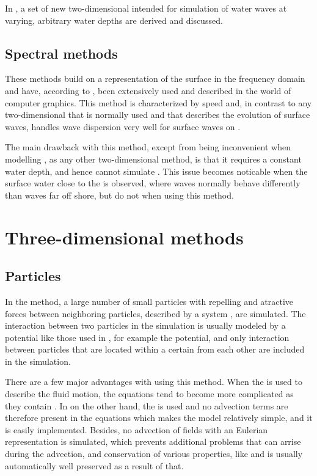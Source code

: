 In , a set of new two-dimensional \PDEs intended for simulation of water waves at varying, arbitrary water depths are derived and discussed.

\subsection{Spectral methods}

These methods build on  a representation of the surface in the frequency domain and have, according to \citep{Monnier}, been extensively used and described in the world of computer graphics. This method is characterized by speed and, in contrast to any two-dimensional \PDE that is normally used and that describes the evolution of surface waves, handles wave dispersion very well for surface waves on .

The main drawback with this method, except from being inconvenient when modelling \FSI, as any other two-dimensional \CFD method, is that it requires a constant water depth, and hence cannot simulate . This issue becomes noticable when the surface water close to the  is observed, where waves normally behave differently than waves far off shore, but do not when using this method.

\section{Three-dimensional methods}

\subsection{Particles}

In the \SPH method, a large number of small particles with repelling and atractive forces between neighboring particles, described by a system , are simulated. The interaction between two particles in the simulation is usually modeled by a potential like those used in \MD, for example the \LJ potential, and only interaction between particles that are located within a certain  from each other are included in the simulation.

There are a few major advantages with using this method. When the  is used to describe the fluid motion, the equations tend to become more complicated as they contain . In \SPH on the other hand, the  is used and no advection terms are therefore present in the equations which makes the model relatively simple, and it is easily implemented. Besides, no advection of fields with an Eulerian representation is simulated, which prevents additional problems that can arrise during the advection, and conservation of various properties, like \momentum and \energy is usually automatically well preserved as a result of that.


